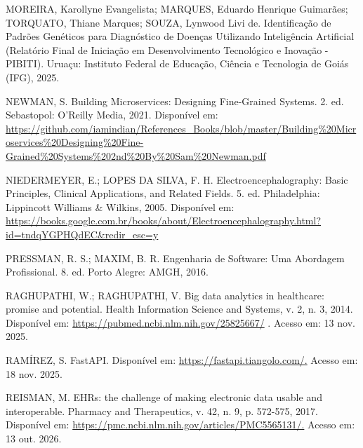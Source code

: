 \begin{SingleSpace}
{\raggedright\setlength{\parindent}{0pt} MOREIRA, Karollyne Evangelista; MARQUES, Eduardo Henrique Guimarães; TORQUATO, Thiane Marques; SOUZA, Lynwood Livi de. Identificação de Padrões Genéticos para Diagnóstico de Doenças Utilizando Inteligência Artificial (Relatório Final de Iniciação em Desenvolvimento Tecnológico e Inovação - PIBITI). Uruaçu: Instituto Federal de Educação, Ciência e Tecnologia de Goiás (IFG), 2025.\par}\smallskip

{\raggedright\setlength{\parindent}{0pt} NEWMAN, S. Building Microservices: Designing Fine-Grained Systems. 2. ed. Sebastopol: O'Reilly Media, 2021. Disponível em: \url{https://github.com/iamindian/References_Books/blob/master/Building%20Microservices%20Designing%20Fine-Grained%20Systems%202nd%20By%20Sam%20Newman.pdf}\par}\smallskip

{\raggedright\setlength{\parindent}{0pt} NIEDERMEYER, E.; LOPES DA SILVA, F. H. Electroencephalography: Basic Principles, Clinical Applications, and Related Fields. 5. ed. Philadelphia: Lippincott Williams \& Wilkins, 2005. Disponível em: \url{https://books.google.com.br/books/about/Electroencephalography.html?id=tndqYGPHQdEC&redir_esc=y}\par}\smallskip

{\raggedright\setlength{\parindent}{0pt} PRESSMAN, R. S.; MAXIM, B. R. Engenharia de Software: Uma Abordagem Profissional. 8. ed. Porto Alegre: AMGH, 2016.\par}\smallskip

{\raggedright\setlength{\parindent}{0pt} RAGHUPATHI, W.; RAGHUPATHI, V. Big data analytics in healthcare: promise and potential. Health Information Science and Systems, v. 2, n. 3, 2014. Disponível em: \url{https://pubmed.ncbi.nlm.nih.gov/25825667/} . Acesso em: 13 nov. 2025.\par}\smallskip

{\raggedright\setlength{\parindent}{0pt} RAMÍREZ, S. FastAPI. Disponível em: \url{https://fastapi.tiangolo.com/.} Acesso em: 18 nov. 2025.\par}\smallskip

{\raggedright\setlength{\parindent}{0pt} REISMAN, M. EHRs: the challenge of making electronic data usable and interoperable. Pharmacy and Therapeutics, v. 42, n. 9, p. 572-575, 2017. Disponível em: \url{https://pmc.ncbi.nlm.nih.gov/articles/PMC5565131/.} Acesso em: 13 out. 2026.\par}\smallskip


\end{SingleSpace}
